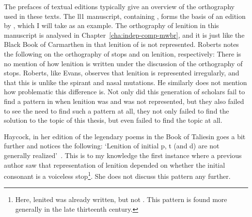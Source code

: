 The prefaces of textual editions typically give an overview of the orthography used in these texts. The \gls{ll1} manuscript, containing , forms the basis of an edition
by \textcite{roberts_brut_1971}, which I will take as an example. The orthography of lenition in this manuscript is analysed in Chapter~\ref{cha:indep-comp-mwbr}, and it is just like the Black Book of Carmarthen in that lenition of  is not represented. Roberts notes the following on the
orthography of stops and on lenition, respectively:
There is no mention of how lenition is written under the discussion of the orthography of stops. Roberts, like Evans, observes that lenition is represented irregularly, and that this is unlike the spirant and nasal mutations. 
He similarly does not mention how problematic this difference is. Not only did this generation of scholars fail to find a pattern in when lenition was and was not represented, but they also failed to see the need to find such a pattern at all, \ie they not only failed to find the solution to the topic of this thesis, but  even failed to find the topic at all.

Haycock, in her edition of the legendary poems in the Book of Taliesin goes a bit further and notices the following: `Lenition of initial p, t (and d) are not generally realized'~\autocite[p.~7, n.~18]{haycock_legendary_2015}. This is to my knowledge the first instance where a previous author saw that representation of lenition depended on whether the initial consonant is a voiceless stop\footnote{Here, lenited  was already written, but not . This pattern is found more generally in the late thirteenth century.}. She does not discuss this pattern any further. 

